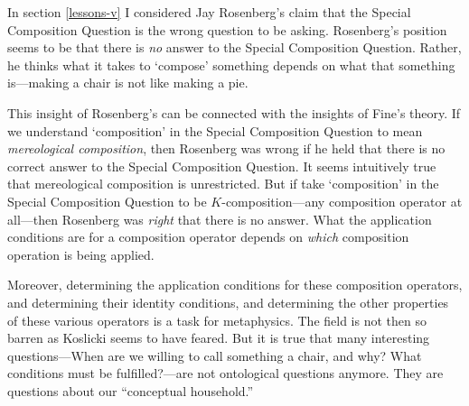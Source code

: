 \documentclass[11pt]{article}
\begin{document}
\begin{spacing}{1.5}
In section \ref{lessons-v} I considered Jay Rosenberg's claim that
the Special Composition Question is the wrong question to be asking.
Rosenberg's position seems to be that there is {\em no} answer to the
Special Composition Question.  Rather, he thinks what it takes to
`compose' something depends on what that something is---making a chair
is not like making a pie.

This insight of Rosenberg's can be connected with the insights of
Fine's theory.  If we understand `composition' in the Special
Composition Question to mean {\em mereological composition}, then
Rosenberg was wrong if he held that there is no correct answer to the
Special Composition Question.  It seems intuitively true that
mereological composition is unrestricted.  But if take `composition'
in the Special Composition Question to be $K$-composition---any
composition operator at all---then Rosenberg was {\em right} that
there is no answer.  What the application conditions are for a
composition operator depends on {\em which} composition operation is
being applied.  

Moreover, determining the application conditions for these composition
operators, and determining their identity conditions, and determining
the other properties of these various operators is a task for
metaphysics.  The field is not then so barren as Koslicki seems to
have feared.  But it is true that many interesting questions---When
are we willing to call something a chair, and why?  What conditions
must be fulfilled?---are not ontological questions anymore.  They are
questions about our ``conceptual household.''

\ifstandalone
\end{spacing}


\fi
\end{document}
